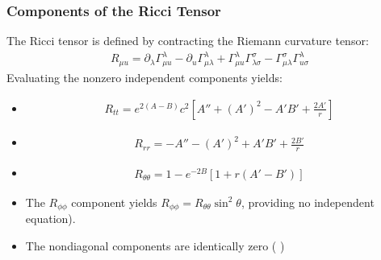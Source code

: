 \documentclass[letterpaper,10pt,english]{jupyterBook}
\begin{document}
\subsubsection{Components of the Ricci Tensor}
\label{\detokenize{ch/relativity-general/schwarzschild-metric:components-of-the-ricci-tensor}}
\sphinxAtStartPar
The Ricci tensor is defined by contracting the Riemann curvature tensor:
\begin{equation*}
\begin{split}R_{\mu
u} = \partial_{\lambda}\Gamma^{\lambda}_{\mu
u} - \partial_{
u}\Gamma^{\lambda}_{\mu\lambda} + \Gamma^{\lambda}_{\mu
u}\Gamma^{\sigma}_{\lambda\sigma} - \Gamma^{\sigma}_{\mu\lambda}\Gamma^{\lambda}_{
u\sigma}\end{split}
\end{equation*}
\sphinxAtStartPar
Evaluating the non\sphinxhyphen{}zero independent components yields:
\begin{itemize}
\item {} 
\sphinxAtStartPar
{}
\begin{equation*}
\begin{split}R_{tt} = e^{2(A-B)} c^2 \left[ A'' + (A')^2 - A'B' + \frac{2A'}{r} \right]\end{split}
\end{equation*}
\item {} 
\sphinxAtStartPar
{}
\begin{equation*}
\begin{split}R_{rr} = -A'' - (A')^2 + A'B' + \frac{2B'}{r}\end{split}
\end{equation*}
\item {} 
\sphinxAtStartPar
{}
\begin{equation*}
\begin{split}R_{\theta \theta} = 1 - e^{-2B} \left[ 1 + r(A' - B') \right]\end{split}
\end{equation*}
\end{itemize}

\sphinxAtStartPar
{}
\begin{itemize}
\item {} 
\sphinxAtStartPar
The \(R_{\phi\phi}\) component yields \(R_{\phi\phi} = R_{\theta \theta} \sin^2 \theta\), providing no independent equation).

\item {} 
\sphinxAtStartPar
The non\sphinxhyphen{}diagonal components are identically zero ( )

\end{itemize}
\end{document}
